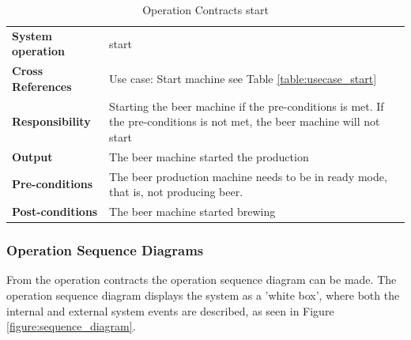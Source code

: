 \begin{table}[H]
    \begin{tabularx}{\textwidth}{|>{\RaggedRight}p{3.7cm}|>{\RaggedRight}X|}
        \hline
        \multicolumn{2}{|c|}{\textbf{start}}\\
        \hline
        \textbf{System operation} & start\\
        \hline
        \textbf{Cross References} & Use case: Start machine see Table \ref{table:usecase_start} \\
        \hline
        \textbf{Responsibility} & Starting the beer machine if the pre-conditions 
        is met.
            If the pre-conditions is not met, the beer machine will not start \\
        \hline
        \textbf{Output} & The beer machine started the production\\
        \hline
        \textbf{Pre-conditions} & 
            The beer production machine needs to be in
            ready mode, that is, not producing beer. \\
        \hline
        \textbf{Post-conditions} & The beer machine started brewing\\
        \hline
    \end{tabularx}
    \caption{Operation Contracts start} 
    \label{table:Operation_Contracts_start}
\end{table}

\subsubsection{Operation Sequence Diagrams}
From the operation contracts the operation sequence diagram can be made. The
operation sequence diagram displays the system as a 'white box', where both the
internal and external system events are described, as seen in Figure
\ref{figure:sequence_diagram}.

